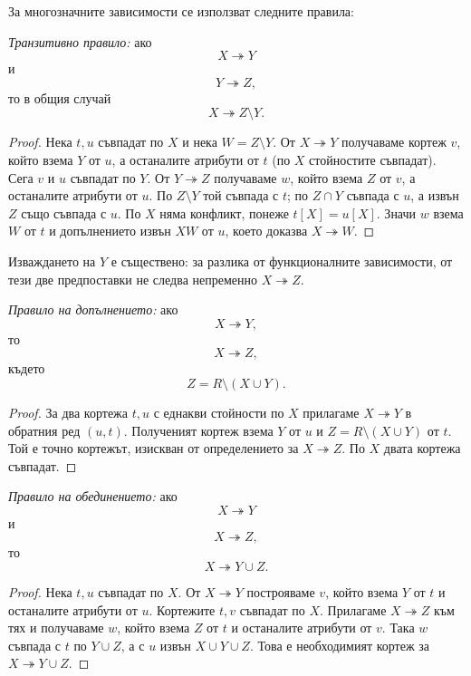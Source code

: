 За многозначните зависимости се използват следните правила:

\begin{prop}
\emph{Транзитивно правило:} ако
\[
X\twoheadrightarrow Y
\]
и
\[
Y\twoheadrightarrow Z,
\]
то в общия случай
\[
X\twoheadrightarrow Z\setminus Y.
\]
\end{prop}

\begin{proof}
Нека $t,u$ съвпадат по $X$ и нека $W=Z\setminus Y$. От $X\twoheadrightarrow Y$ получаваме кортеж $v$, който взема $Y$ от $u$, а останалите атрибути от $t$ (по $X$ стойностите съвпадат). Сега $v$ и $u$ съвпадат по $Y$. От $Y\twoheadrightarrow Z$ получаваме $w$, който взема $Z$ от $v$, а останалите атрибути от $u$. По $Z\setminus Y$ той съвпада с $t$; по $Z\cap Y$ съвпада с $u$, а извън $Z$ също съвпада с $u$. По $X$ няма конфликт, понеже $t[X]=u[X]$. Значи $w$ взема $W$ от $t$ и допълнението извън $XW$ от $u$, което доказва $X\twoheadrightarrow W$.
\end{proof}

Изваждането на $Y$ е съществено: за разлика от функционалните зависимости, от тези две предпоставки не следва непременно $X\twoheadrightarrow Z$.

\begin{prop}
\emph{Правило на допълнението:} ако
\[
X\twoheadrightarrow Y,
\]
то
\[
X\twoheadrightarrow Z,
\]
където
\[
Z=R\setminus(X\cup Y).
\]
\end{prop}

\begin{proof}
За два кортежа $t,u$ с еднакви стойности по $X$ прилагаме $X\twoheadrightarrow Y$ в обратния ред $(u,t)$. Полученият кортеж взема $Y$ от $u$ и $Z=R\setminus(X\cup Y)$ от $t$. Той е точно кортежът, изискван от определението за $X\twoheadrightarrow Z$. По $X$ двата кортежа съвпадат.
\end{proof}

\begin{prop}
\emph{Правило на обединението:} ако
\[
X\twoheadrightarrow Y
\]
и
\[
X\twoheadrightarrow Z,
\]
то
\[
X\twoheadrightarrow Y\cup Z.
\]
\end{prop}

\begin{proof}
Нека $t,u$ съвпадат по $X$. От $X\twoheadrightarrow Y$ построяваме $v$, който взема $Y$ от $t$ и останалите атрибути от $u$. Кортежите $t,v$ съвпадат по $X$. Прилагаме $X\twoheadrightarrow Z$ към тях и получаваме $w$, който взема $Z$ от $t$ и останалите атрибути от $v$. Така $w$ съвпада с $t$ по $Y\cup Z$, а с $u$ извън $X\cup Y\cup Z$. Това е необходимият кортеж за $X\twoheadrightarrow Y\cup Z$.
\end{proof}


